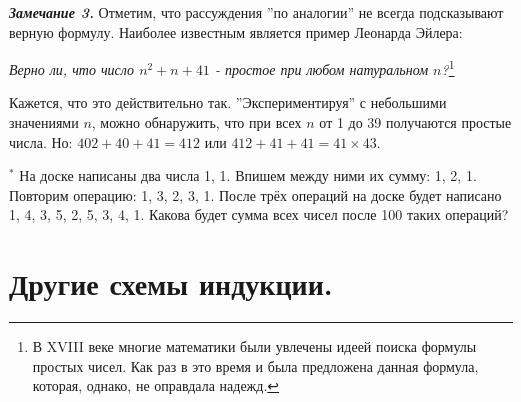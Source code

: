 \textbf{\textit{Замечание 3.}} Отметим, что рассуждения ''по аналогии'' не всегда подсказывают верную формулу. Наиболее
известным является пример Леонарда Эйлера:
\par
\textit{Верно ли, что число $n^2 + n + 41$ - простое при любом натуральном $n$?}\footnote{В XVIII веке многие математики были увлечены идеей поиска формулы простых чисел. Как раз в это время и была предложена данная формула, которая, однако, не оправдала надежд.}
\par
Кажется, что это действительно так. ''Экспериментируя'' с небольшими значениями $n$, можно обнаружить, что при всех $n$ от 1 до 39 получаются простые числа. Но: $402 + 40 +4 1 = 412$ или $412 + 41 + 41 = 41 \times 43$.

\newpage

\begin{thm} $^*$
На доске написаны два числа 1, 1. Впишем между ними их сумму: 1, 2, 1. Повторим операцию: 1, 3, 2, 3, 1. После трёх операций на доске будет написано 1, 4, 3, 5, 2, 5, 3, 4, 1. Какова будет сумма всех чисел после 100 таких операций? 
\end{thm}

\newpage

\section{Другие схемы индукции.}


